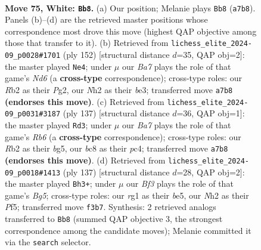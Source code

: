 \documentclass[11pt]{article}
\begin{document}
\clearpage

\begin{figure}[p]\centering
\begin{subfigure}{0.46\textwidth}\centering
\resizebox{\linewidth}{!}{%
\newchessgame
\chessboard[
  setfen={2b5/B3k3/8/2K5/PP6/5B1p/1R5N/6r1 w - - 7 75},
  showmover=false,
  pgfstyle=straightmove, color=movearrow, markmove={a7-b8}
]}
\caption{}
\end{subfigure}\hfill
\begin{subfigure}{0.46\textwidth}\centering
\resizebox{\linewidth}{!}{%
\newchessgame
\chessboard[
  setfen={8/1K5p/P1BN4/6p1/1k6/4b3/6P1/8 w - - 7 77},
  showmover=false,
  pgfstyle=straightmove, color=movearrow, markmove={d6-e4}
]}
\caption{}
\end{subfigure}
\\[4pt]
\begin{subfigure}{0.46\textwidth}\centering
\resizebox{\linewidth}{!}{%
\newchessgame
\chessboard[
  setfen={8/3k4/8/2K3Bp/2P5/1r3bP1/R7/8 b - - 28 69},
  showmover=false,
  pgfstyle=straightmove, color=movearrow, markmove={b3-d3}
]}
\caption{}
\end{subfigure}\hfill
\begin{subfigure}{0.46\textwidth}\centering
\resizebox{\linewidth}{!}{%
\newchessgame
\chessboard[
  setfen={8/8/8/2k1Bp1p/5PbP/3R4/2r5/5K2 b - - 22 69},
  showmover=false,
  pgfstyle=straightmove, color=movearrow, markmove={g4-h3}
]}
\caption{}
\end{subfigure}
\caption{\textbf{Move 75, White: \texttt{Bb8}.} (a) Our position; Melanie plays \texttt{Bb8} (\texttt{a7b8}). Panels (b)--(d) are the retrieved master positions whose correspondence most drove this move (highest QAP objective among those that transfer to it). (b) Retrieved from \texttt{lichess\_elite\_2024-09\_p0028\#1701} (ply 152) [structural distance $d$=35, QAP obj=2]: the master played \texttt{Ne4}; under $\mu$ our \emph{Ba7} plays the role of that game's \emph{Nd6} (a \textbf{cross-type} correspondence); cross-type roles: our \emph{R}b2 as their \emph{P}g2, our \emph{N}h2 as their \emph{b}e3; transferred move \texttt{a7b8} \textbf{(endorses this move)}. (c) Retrieved from \texttt{lichess\_elite\_2024-09\_p0031\#3187} (ply 137) [structural distance $d$=36, QAP obj=1]: the master played \texttt{Rd3}; under $\mu$ our \emph{Ba7} plays the role of that game's \emph{Rb6} (a \textbf{cross-type} correspondence); cross-type roles: our \emph{R}b2 as their \emph{b}g5, our \emph{b}c8 as their \emph{p}c4; transferred move \texttt{a7b8} \textbf{(endorses this move)}. (d) Retrieved from \texttt{lichess\_elite\_2024-09\_p0018\#1413} (ply 137) [structural distance $d$=28, QAP obj=2]: the master played \texttt{Bh3+}; under $\mu$ our \emph{Bf3} plays the role of that game's \emph{Bg5}; cross-type roles: our \emph{r}g1 as their \emph{b}e5, our \emph{N}h2 as their \emph{P}f5; transferred move \texttt{f3b7}. Synthesis: 2 retrieved analogs transferred to \texttt{Bb8} (summed QAP objective 3, the strongest correspondence among the candidate moves); Melanie committed it via the \texttt{search} selector.}
\label{fig:thought-m148}
\end{figure}
\end{document}
